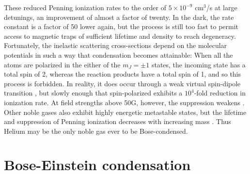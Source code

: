 	These reduced Penning ionization rates to the order of $5\times10^{-9}$ cm$^3$/s at large detunings, an improvement of almost a factor of twenty.
	In the dark, the rate constant is a factor of 50 lower again, but the process is  still too fast to permit access to magnetic traps of sufficient lifetime and density to reach degeneracy.
	Fortunately, the inelastic scattering cross-sections depend on the molecular potentials in such a way that condensation becomes attainable: When all the atoms are polarized in the either of the $m_J=\pm1$ states, the incoming state has a total spin of 2, whereas the reaction products have a total spin of 1, and so this process is forbidden.
	In reality, it does occur through a weak virtual spin-dipole transition \cite{shlyapnikov94} , but slowly enough that spin-polarized \mhe exhibits a $10^4$-fold reduction in ionization rate.
	At field strengths above 50G, however, the suppression weakens \cite{shlyapnikov94,Borbely12}.
	Other noble gases also exhibit highly energetic metastable states, but the lifetime and suppression of Penning ionization decreases with increasing mass \cite{orzel99, spoden05}.
	Thus Helium may be the only noble gas ever to be Bose-condensed.
	

	
	
	

\section{Bose-Einstein condensation}


